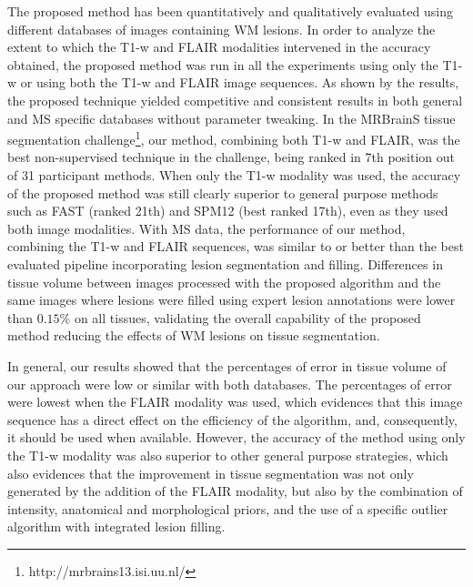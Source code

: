 The proposed method has been quantitatively and qualitatively evaluated using different databases of images containing WM lesions. In order to analyze the extent to which the T1-w and FLAIR modalities intervened in the accuracy obtained, the proposed method was run in all the experiments using only the T1-w or using both the T1-w and FLAIR image sequences. As shown by the results, the proposed technique yielded competitive and consistent results in both general and MS specific databases without parameter tweaking. In the MRBrainS tissue segmentation challenge\footnote{http://mrbrains13.isi.uu.nl/}, our method, combining both T1-w and FLAIR, was the best non-supervised technique in the challenge, being ranked in 7th position out of 31 participant methods. When only the T1-w modality was used, the accuracy of the proposed method was still clearly superior to general purpose methods such as FAST (ranked 21th) and SPM12 (best ranked 17th), even as they used both image modalities. With MS data, the performance of our method, combining the T1-w and FLAIR sequences, was similar to or better than the best evaluated pipeline incorporating lesion segmentation and filling. Differences in tissue volume between images processed with the proposed algorithm and the same images where lesions were filled using expert lesion annotations were lower than $0.15\%$ on all tissues, validating the overall capability of the proposed method reducing the effects of WM lesions on tissue segmentation. 

In general, our results showed that the percentages of error in tissue volume of our approach were low or similar with both databases. The percentages of error were lowest when the FLAIR modality was used, which evidences that this image sequence has a direct effect on the efficiency of the algorithm, and, consequently, it should be used when available. However, the accuracy of the method using only the T1-w modality was also superior to other general purpose strategies, which also evidences that the improvement in tissue segmentation was not only generated by the addition of the FLAIR modality, but also by the combination of intensity, anatomical and morphological priors, and the use of a specific outlier algorithm with integrated lesion filling.


